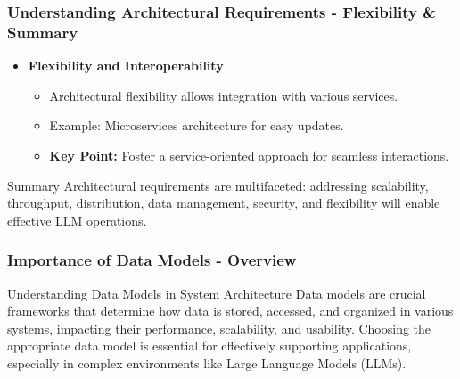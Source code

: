 \documentclass[aspectratio=169]{beamer}
\begin{document}
\begin{frame}[fragile]
    \frametitle{Understanding Architectural Requirements - Flexibility & Summary}
    \begin{itemize}
        \item \textbf{Flexibility and Interoperability}
        \begin{itemize}
            \item Architectural flexibility allows integration with various services.
            \item Example: Microservices architecture for easy updates.
            \item \textbf{Key Point:} Foster a service-oriented approach for seamless interactions.
        \end{itemize}
    \end{itemize}
    
    \begin{block}{Summary}
        Architectural requirements are multifaceted: addressing scalability, throughput, distribution, data management, security, and flexibility will enable effective LLM operations.
    \end{block}
\end{frame}

\begin{frame}[fragile]
    \frametitle{Importance of Data Models - Overview}
    \begin{block}{Understanding Data Models in System Architecture}
        Data models are crucial frameworks that determine how data is stored, accessed, and organized in various systems, impacting their performance, scalability, and usability. 
        Choosing the appropriate data model is essential for effectively supporting applications, especially in complex environments like Large Language Models (LLMs).
    \end{block}
\end{frame}
\end{document}
